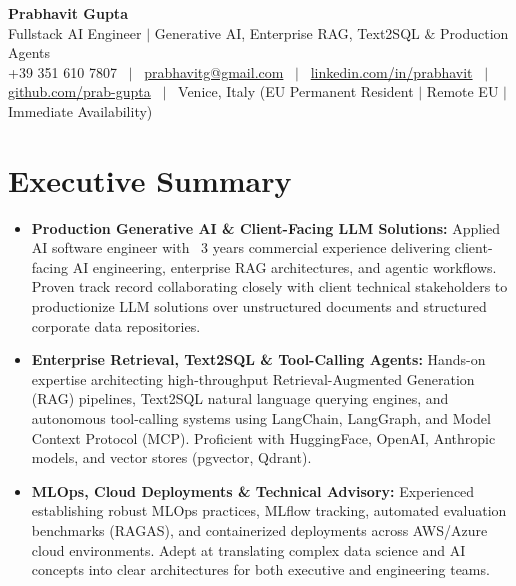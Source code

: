 \documentclass[a4paper,10pt]{article}
\begin{document}
\begin{minipage}[c]{0.80\textwidth}
  {\Huge\bfseries Prabhavit Gupta}\\[3pt]
  {\color{accent}\large Fullstack AI Engineer $\vert$ Generative AI, Enterprise RAG, Text2SQL $\&$ Production Agents}\\[6pt]
  {\footnotesize +39 351 610 7807 ~$\vert$~
  \href{mailto:prabhavitg@gmail.com}{prabhavitg@gmail.com} ~$\vert$~
  \href{https://www.linkedin.com/in/prabhavit/}{linkedin.com/in/prabhavit} ~$\vert$~
  \href{https://github.com/prab-gupta}{github.com/prab-gupta} ~$\vert$~
  Venice, Italy (EU Permanent Resident $\vert$ Remote EU $\vert$ Immediate Availability)}
\end{minipage}\hfill

\vspace{6pt}

\section{Executive Summary}
\begin{itemize}
  \item \textbf{Production Generative AI \& Client-Facing LLM Solutions:} Applied AI software engineer with ~3 years commercial experience delivering client-facing AI engineering, enterprise RAG architectures, and agentic workflows. Proven track record collaborating closely with client technical stakeholders to productionize LLM solutions over unstructured documents and structured corporate data repositories.
  \item \textbf{Enterprise Retrieval, Text2SQL \& Tool-Calling Agents:} Hands-on expertise architecting high-throughput Retrieval-Augmented Generation (RAG) pipelines, Text2SQL natural language querying engines, and autonomous tool-calling systems using LangChain, LangGraph, and Model Context Protocol (MCP). Proficient with HuggingFace, OpenAI, Anthropic models, and vector stores (pgvector, Qdrant).
  \item \textbf{MLOps, Cloud Deployments \& Technical Advisory:} Experienced establishing robust MLOps practices, MLflow tracking, automated evaluation benchmarks (RAGAS), and containerized deployments across AWS/Azure cloud environments. Adept at translating complex data science and AI concepts into clear architectures for both executive and engineering teams.
\end{itemize}
\end{document}
